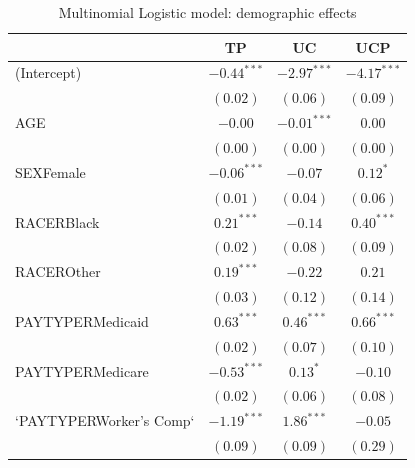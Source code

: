 \documentclass[12pt,twoside]{reedthesis}
\begin{document}
  \begin{table}
  \caption{Multinomial Logistic model: demographic effects}
  \begin{center}
  \begin{footnotesize}
  \begin{tabular}{l c c c }
  \hline
   & TP & UC & UCP \\
  \hline
  (Intercept)              & $\mathbf{-0.44}^{***}$ & $\mathbf{-2.97}^{***}$ & $\mathbf{-4.17}^{***}$ \\
                           & $(0.02)$               & $(0.06)$               & $(0.09)$               \\
  AGE                      & $-0.00$                & $\mathbf{-0.01}^{***}$ & $0.00$                 \\
                           & $(0.00)$               & $(0.00)$               & $(0.00)$               \\
  SEXFemale                & $\mathbf{-0.06}^{***}$ & $-0.07$                & $0.12^{*}$             \\
                           & $(0.01)$               & $(0.04)$               & $(0.06)$               \\
  RACERBlack               & $\mathbf{0.21}^{***}$  & $-0.14$                & $\mathbf{0.40}^{***}$  \\
                           & $(0.02)$               & $(0.08)$               & $(0.09)$               \\
  RACEROther               & $\mathbf{0.19}^{***}$  & $-0.22$                & $0.21$                 \\
                           & $(0.03)$               & $(0.12)$               & $(0.14)$               \\
  PAYTYPERMedicaid         & $\mathbf{0.63}^{***}$  & $\mathbf{0.46}^{***}$  & $\mathbf{0.66}^{***}$  \\
                           & $(0.02)$               & $(0.07)$               & $(0.10)$               \\
  PAYTYPERMedicare         & $\mathbf{-0.53}^{***}$ & $0.13^{*}$             & $-0.10$                \\
                           & $(0.02)$               & $(0.06)$               & $(0.08)$               \\
  `PAYTYPERWorker's Comp`  & $\mathbf{-1.19}^{***}$ & $\mathbf{1.86}^{***}$  & $-0.05$                \\
                           & $(0.09)$               & $(0.09)$               & $(0.29)$               \\

\end{tabular}
\end{footnotesize}
\end{center}
\end{table}
\end{document}
